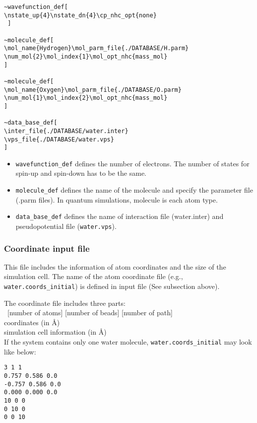 \begin{verbatim}
~wavefunction_def[
\nstate_up{4}\nstate_dn{4}\cp_nhc_opt{none}
 ]

~molecule_def[
\mol_name{Hydrogen}\mol_parm_file{./DATABASE/H.parm}
\num_mol{2}\mol_index{1}\mol_opt_nhc{mass_mol}
]

~molecule_def[
\mol_name{Oxygen}\mol_parm_file{./DATABASE/O.parm}
\num_mol{1}\mol_index{2}\mol_opt_nhc{mass_mol}
]

~data_base_def[
\inter_file{./DATABASE/water.inter}
\vps_file{./DATABASE/water.vps}
]
\end{verbatim}

\begin{itemize}
\item \verb+wavefunction_def+ defines the number of electrons. The number of states for spin-up and spin-down has to be the same. 

\item \verb+molecule_def+ defines the name of the molecule and specify the parameter file (.parm files). In quantum simulations, molecule is each atom type. 

\item \verb+data_base_def+ defines the name of interaction file (water.inter) and pseudopotential file (\verb+water.vps+).  

\end{itemize}

\subsubsection{Coordinate input file}
This file includes the information of atom coordinates and the size of the simulation cell. The name of the atom coordinate file (e.g., \verb+water.coords_initial+) is defined in input file (See subsection above).

The coordinate file includes three parts:\\
~[number of atoms] [number of beads] [number of path]\\
coordinates (in \AA)\\
simulation cell information (in \AA)\\

If the system contains only one water molecule, \verb+water.coords_initial+ may look like below:

\begin{verbatim}
3 1 1
0.757 0.586 0.0
-0.757 0.586 0.0
0.000 0.000 0.0
10 0 0
0 10 0
0 0 10
\end{verbatim}

